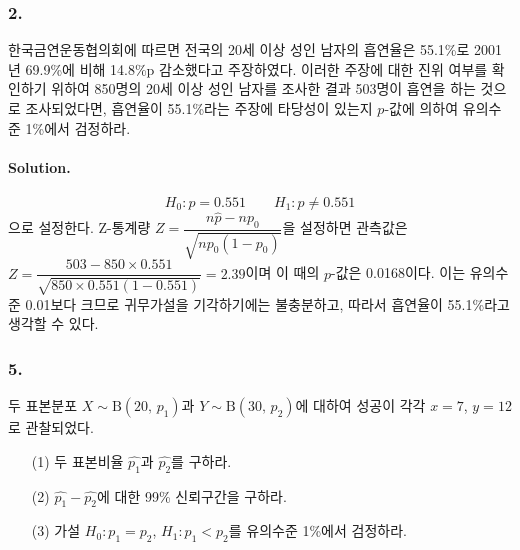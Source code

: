 \subsubsection{2.} 한국금연운동협의회에 따르면 전국의 20세 이상 성인 남자의 흡연율은 55.1\%로 2001년 69.9\%에 비해 14.8\%p 감소했다고
주장하였다. 이러한 주장에 대한 진위 여부를 확인하기 위하여 850명의 20세 이상 성인 남자를 조사한 결과 503명이 흡연을 하는 것으로 조사되었다면, 
흡연율이 55.1\%라는 주장에 타당성이 있는지 $p$-값에 의하여 유의수준 1\%에서 검정하라.

\paragraph{Solution.}
\[H_0:p=0.551 \qquad H_1:p\neq0.551\]
으로 설정한다. Z-통계량 $Z=\dfrac{n\hat{p}-np_0}{\sqrt{np_0\left(1-p_0\right)}}$을 설정하면 관측값은
$Z=\dfrac{503-850\times0.551}{\sqrt{850\times0.551\left(1-0.551\right)}}=2.39$이며 이 때의 $p$-값은 0.0168이다.
이는 유의수준 0.01보다 크므로 귀무가설을 기각하기에는 불충분하고, 따라서 흡연율이 55.1\%라고 생각할 수 있다.

\subsubsection{5.} 두 표본분포 $X\sim \mathrm{B}\left(20,\,p_1\right)$과 $Y\sim \mathrm{B}\left(30,\,p_2\right)$에 대하여
성공이 각각 $x=7$, $y=12$로 관찰되었다.

\begin{itemize}
    \item[(1)] 두 표본비율 $\hat{p_1}$과 $\hat{p_2}$를 구하라.
    \item[(2)] $\hat{p_1}-\hat{p_2}$에 대한 99\% 신뢰구간을 구하라.
    \item[(3)] 가설 $H_0:p_1=p_2$, $H_1:p_1<p_2$를 유의수준 1\%에서 검정하라.
\end{itemize}

